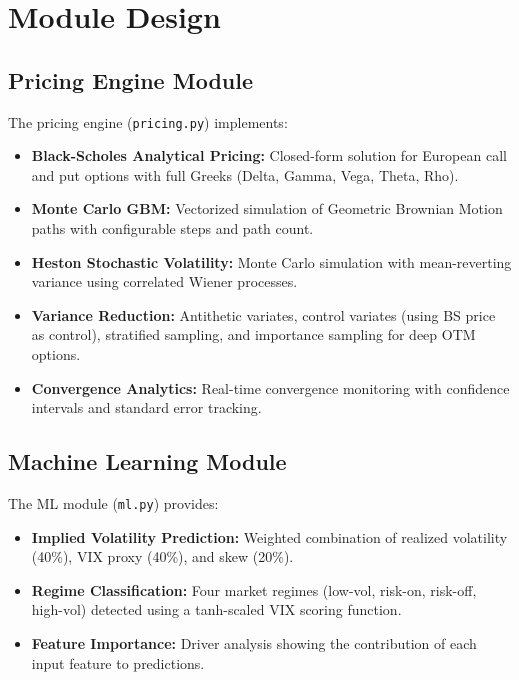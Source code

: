 \documentclass[12pt,a4paper]{report}
\begin{document}
\section{Module Design}

\subsection{Pricing Engine Module}

The pricing engine (\texttt{pricing.py}) implements:

\begin{itemize}
    \item \textbf{Black-Scholes Analytical Pricing:} Closed-form solution for European call and put options with full Greeks (Delta, Gamma, Vega, Theta, Rho).
    \item \textbf{Monte Carlo GBM:} Vectorized simulation of Geometric Brownian Motion paths with configurable steps and path count.
    \item \textbf{Heston Stochastic Volatility:} Monte Carlo simulation with mean-reverting variance using correlated Wiener processes.
    \item \textbf{Variance Reduction:} Antithetic variates, control variates (using BS price as control), stratified sampling, and importance sampling for deep OTM options.
    \item \textbf{Convergence Analytics:} Real-time convergence monitoring with confidence intervals and standard error tracking.
\end{itemize}

\subsection{Machine Learning Module}

The ML module (\texttt{ml.py}) provides:

\begin{itemize}
    \item \textbf{Implied Volatility Prediction:} Weighted combination of realized volatility (40\%), VIX proxy (40\%), and skew (20\%).
    \item \textbf{Regime Classification:} Four market regimes (low-vol, risk-on, risk-off, high-vol) detected using a tanh-scaled VIX scoring function.
    \item \textbf{Feature Importance:} Driver analysis showing the contribution of each input feature to predictions.
\end{itemize}
\end{document}
